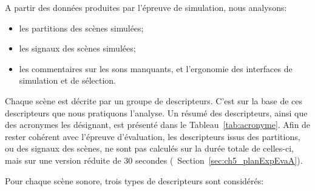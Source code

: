 A partir des données produites par l'épreuve de simulation, nous analysons:

\begin{itemize}
\item les partitions des scènes simulées;
\item les signaux des scènes simulées;
\item les commentaires sur les sons manquants, et l'ergonomie des interfaces de simulation et de sélection.
\end{itemize}

Chaque scène est décrite par un groupe de descripteurs. C'est sur la base de ces descripteurs que nous pratiquons l'analyse. Un résumé des descripteurs, ainsi que des acronymes les désignant, est présenté dans le Tableau~\ref{tab:acronyme}. Afin de rester cohérent avec l'épreuve d'évaluation, les descripteurs issus des partitions, ou des signaux des scènes, ne sont pas calculés sur la durée totale de celles-ci, mais sur une version réduite de 30 secondes (\cf~Section~\ref{sec:ch5_planExpEvaA}). 

Pour chaque scène sonore, trois types de descripteurs sont considérés:

